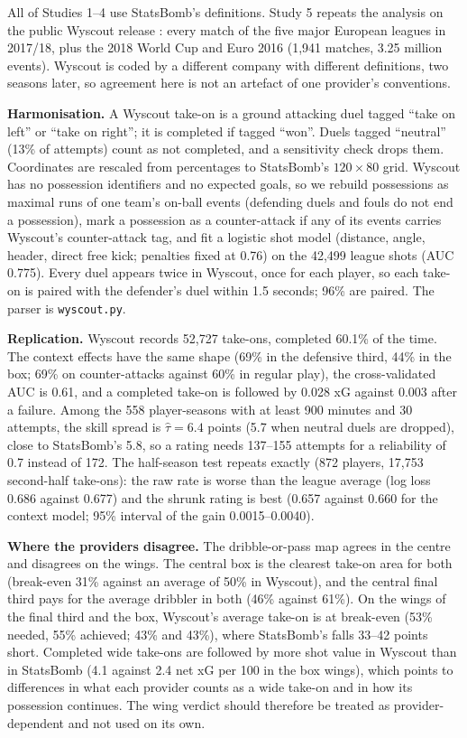 \documentclass[
  12pt]{article}
\begin{document}
All of Studies 1--4 use StatsBomb's definitions. Study 5 repeats the
analysis on the public Wyscout release \citep{pappalardo2019data}: every
match of the five major European leagues in 2017/18, plus the 2018 World
Cup and Euro 2016 (1,941 matches, 3.25 million events). Wyscout is coded
by a different company with different definitions, two seasons later, so
agreement here is not an artefact of one provider's conventions.

\textbf{Harmonisation.} A Wyscout take-on is a ground attacking duel
tagged ``take on left'' or ``take on right''; it is completed if tagged
``won''. Duels tagged ``neutral'' (13\% of attempts) count as not
completed, and a sensitivity check drops them. Coordinates are rescaled
from percentages to StatsBomb's \(120\times80\) grid. Wyscout has no
possession identifiers and no expected goals, so we rebuild possessions
as maximal runs of one team's on-ball events (defending duels and fouls
do not end a possession), mark a possession as a counter-attack if any
of its events carries Wyscout's counter-attack tag, and fit a logistic
shot model (distance, angle, header, direct free kick; penalties fixed
at 0.76) on the 42,499 league shots (AUC 0.775). Every duel appears
twice in Wyscout, once for each player, so each take-on is paired with
the defender's duel within 1.5 seconds; 96\% are paired. The parser is
\texttt{wyscout.py}.

\textbf{Replication.} Wyscout records 52,727 take-ons, completed 60.1\%
of the time. The context effects have the same shape (69\% in the
defensive third, 44\% in the box; 69\% on counter-attacks against 60\%
in regular play), the cross-validated AUC is 0.61, and a completed
take-on is followed by 0.028 xG against 0.003 after a failure. Among the
558 player-seasons with at least 900 minutes and 30 attempts, the skill
spread is \(\hat\tau=6.4\) points (5.7 when neutral duels are dropped),
close to StatsBomb's 5.8, so a rating needs 137--155 attempts for a
reliability of 0.7 instead of 172. The half-season test repeats exactly
(872 players, 17,753 second-half take-ons): the raw rate is worse than
the league average (log loss 0.686 against 0.677) and the shrunk rating
is best (0.657 against 0.660 for the context model; 95\% interval of the
gain 0.0015--0.0040).

\textbf{Where the providers disagree.} The dribble-or-pass map agrees in
the centre and disagrees on the wings. The central box is the clearest
take-on area for both (break-even 31\% against an average of 50\% in
Wyscout), and the central final third pays for the average dribbler in
both (46\% against 61\%). On the wings of the final third and the box,
Wyscout's average take-on is at break-even (53\% needed, 55\% achieved;
43\% and 43\%), where StatsBomb's falls 33--42 points short. Completed
wide take-ons are followed by more shot value in Wyscout than in
StatsBomb (4.1 against 2.4 net xG per 100 in the box wings), which
points to differences in what each provider counts as a wide take-on and
in how its possession continues. The wing verdict should therefore be
treated as provider-dependent and not used on its own.
\end{document}
